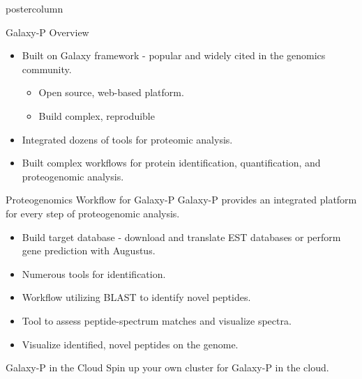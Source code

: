 \documentclass[final]{beamer}
\title[Innovative, Reproducible MS-Based Proteomic Informatics in the Cloud for Emerging Applications with Galaxy-P and CloudBioLinux]{}
\author[John M. Chilton; James E. Johnson; Ebbing P. de Jong; Getiria Onsongo; Benjamin J.
Lynch; Pratik D. Jagtap; Timothy J Griffin]{}
\institute[]{University of Minnesota Supcomputing Institute}
\date{June 10th, 2013}
\newlength{\columnheight}
\begin{document}
\begin{frame}
  \begin{columns}

    \begin{column}{.49\textwidth}
      \begin{beamercolorbox}[center,wd=\textwidth]{postercolumn}
        \begin{minipage}[T]{.95\textwidth}  %
          \parbox[t][\columnheight]{\textwidth}{
            \begin{block}{Galaxy-P Overview}
              \begin{itemize}
              \item Built on Galaxy framework - popular and widely cited in the genomics community.
                \begin{itemize}
                  \item Open source, web-based platform.
                  \item Build complex, reproduible 
                \end{itemize}
              \item Integrated dozens of tools for proteomic analysis.
              \item Built complex workflows for protein identification, quantification, and proteogenomic analysis.
              \end{itemize}
            \end{block}
            \vfill
            \begin{block}{Proteogenomics Workflow for Galaxy-P}
              Galaxy-P provides an integrated platform for every step of proteogenomic analysis.
              \begin{itemize}
                \item Build target database - download and translate EST databases or perform gene prediction with Augustus.
                \item Numerous tools for identification. 
                \item Workflow utilizing BLAST to identify novel peptides.
                \item Tool to assess peptide-spectrum matches and visualize spectra.
                \item Visualize identified, novel peptides on the genome.
              \end{itemize}
            \end{block}
            \vfill
            \begin{block}{Galaxy-P in the Cloud}
              Spin up your own cluster for Galaxy-P in the cloud.
            \end{block}
            \vfill
          }
        \end{minipage}
      \end{beamercolorbox}
    \end{column}


\end{columns}
\end{frame}
\end{document}
